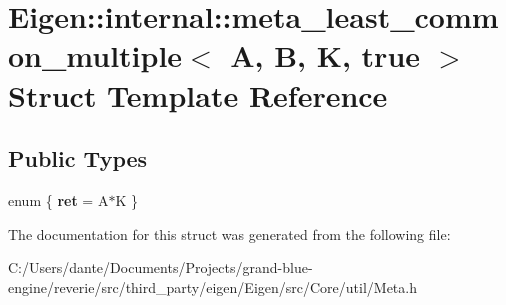 \hypertarget{struct_eigen_1_1internal_1_1meta__least__common__multiple_3_01_a_00_01_b_00_01_k_00_01true_01_4}{}\section{Eigen\+::internal\+::meta\+\_\+least\+\_\+common\+\_\+multiple$<$ A, B, K, true $>$ Struct Template Reference}
\label{struct_eigen_1_1internal_1_1meta__least__common__multiple_3_01_a_00_01_b_00_01_k_00_01true_01_4}
\subsection*{Public Types}
\begin{DoxyCompactItemize}
\item 
\mbox{\label{struct_eigen_1_1internal_1_1meta__least__common__multiple_3_01_a_00_01_b_00_01_k_00_01true_01_4_a4d05499857654c0378774cb63bb0293b}} 
enum \{ {\bfseries ret} = A$\ast$K
 \}
\end{DoxyCompactItemize}


The documentation for this struct was generated from the following file\+:\begin{DoxyCompactItemize}
\item 
C\+:/\+Users/dante/\+Documents/\+Projects/grand-\/blue-\/engine/reverie/src/third\+\_\+party/eigen/\+Eigen/src/\+Core/util/Meta.\+h\end{DoxyCompactItemize}
